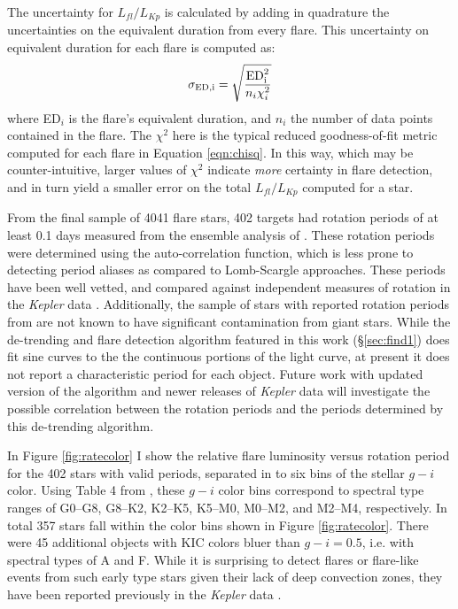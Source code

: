 \documentclass[twocolumn]{aastex6}
\newcommand{\Kepler}{\textsl{Kepler}\xspace}
\begin{document}
The uncertainty for $L_{fl}/L_{Kp}$ is calculated by adding in quadrature the uncertainties on the equivalent duration from every flare. This uncertainty on equivalent duration for each flare is computed as:
\begin{equation}
\sigma_{\rm{ED},i} =  \sqrt{\frac{\rm{ED}_i^2}{ n_i \chi_i^2}}
\end{equation}
where ED$_i$ is the flare's equivalent duration, and $n_i$ the number of data points contained in the flare. The $\chi^2$ here is the typical reduced goodness-of-fit metric computed for each flare in Equation \ref{eqn:chisq}. In this way, which may be counter-intuitive, larger values of $\chi^2$ indicate {\it more} certainty in flare detection, and in turn yield a smaller error on the total $L_{fl}/L_{Kp}$ computed for a star.


From the final sample of 4041 flare stars, 402 targets had rotation periods of at least 0.1 days measured from the ensemble analysis of \citet{mcquillan2014}.
These rotation periods were determined using the auto-correlation function, which is less prone to detecting period aliases as compared to Lomb-Scargle approaches. These periods have been well vetted, and compared against independent measures of rotation in the \Kepler data \citep{reinhold2013}. Additionally, the sample of stars with reported rotation periods from \citet{mcquillan2014} are not known to have significant contamination from giant stars. 
While the de-trending and flare detection algorithm featured in this work (\S\ref{sec:find1}) does fit sine curves to the the continuous portions of the light curve, at present it does not report a characteristic period for each object. Future work with updated version of the algorithm and newer releases of \Kepler data will investigate the possible correlation between the \citet{mcquillan2014} rotation periods and the periods determined by this de-trending algorithm. 


In Figure \ref{fig:ratecolor} I show the relative flare luminosity versus rotation period for the 402 stars with valid periods, separated in to six bins of the stellar $g-i$ color. Using Table 4 from \citet{covey2007}, these $g-i$ color bins correspond to spectral type ranges of G0--G8, G8--K2, K2--K5, K5--M0, M0--M2, and M2--M4, respectively. In total 357 stars fall within the color bins shown in Figure \ref{fig:ratecolor}. There were 45 additional objects with KIC colors bluer than $g-i=0.5$, i.e. with spectral types of A and F. While it is surprising to detect flares or flare-like events from such early type stars given their lack of deep convection zones, they have been reported previously in the \Kepler data \citep{balona2012}. 
\end{document}
